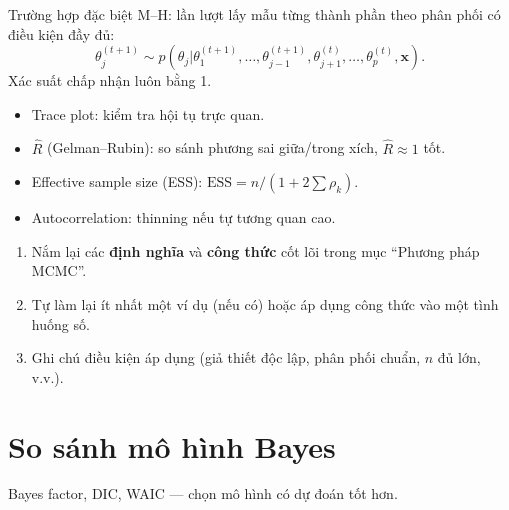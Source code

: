 \documentclass[12pt,a4paper]{article}
\begin{document}
\begin{phuongphap}[title={Gibbs Sampling}]
  Trường hợp đặc biệt M--H: lần lượt lấy mẫu từng thành phần theo phân phối có điều kiện đầy đủ:
  \[
    \theta_j^{(t+1)} \sim p(\theta_j|\theta_1^{(t+1)}, \ldots, \theta_{j-1}^{(t+1)}, \theta_{j+1}^{(t)}, \ldots, \theta_p^{(t)}, \mathbf{x}).
  \]
  Xác suất chấp nhận luôn bằng 1.
\end{phuongphap}

\begin{phuongphap}[title={Chẩn đoán MCMC}]
  \begin{itemize}
    \item Trace plot: kiểm tra hội tụ trực quan.
    \item $\hat{R}$ (Gelman--Rubin): so sánh phương sai giữa/trong xích, $\hat{R} \approx 1$ tốt.
    \item Effective sample size (ESS): $\text{ESS} = n / (1 + 2\sum \rho_k)$.
    \item Autocorrelation: thinning nếu tự tương quan cao.
  \end{itemize}
\end{phuongphap}


\begin{tongket}[title={Tổng kết: Phương pháp MCMC}]
\begin{enumerate}
  \item Nắm lại các \textbf{định nghĩa} và \textbf{công thức} cốt lõi trong mục ``Phương pháp MCMC''.
  \item Tự làm lại ít nhất một ví dụ (nếu có) hoặc áp dụng công thức vào một tình huống số.
  \item Ghi chú điều kiện áp dụng (giả thiết độc lập, phân phối chuẩn, $n$ đủ lớn, v.v.).
\end{enumerate}
\end{tongket}

\section{So sánh mô hình Bayes}

\begin{dongco}[title={Động cơ --- So sánh mô hình Bayes}]
Bayes factor, DIC, WAIC --- chọn mô hình có dự đoán tốt hơn.
\end{dongco}
\end{document}
